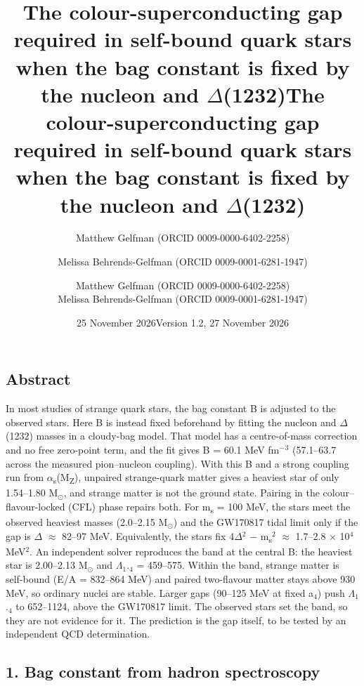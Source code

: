 \documentclass[
  11pt,
]{article}
\title{The colour-superconducting gap required in self-bound quark stars
when the bag constant is fixed by the nucleon and \ensuremath{\Delta}(1232)}
\author{Matthew Gelfman (ORCID 0009-0000-6402-2258) \and Melissa
Behrends-Gelfman (ORCID 0009-0001-6281-1947)}
\date{25 November 2026}
\title{The colour-superconducting gap required in self-bound quark stars when
the bag constant is fixed by the nucleon and \ensuremath{\Delta}(1232)}
\author{Matthew Gelfman (ORCID 0009-0000-6402-2258) \\ Melissa Behrends-Gelfman (ORCID 0009-0001-6281-1947)}
\date{Version 1.2, 27 November 2026}
\begin{document}
\maketitle
\hypertarget{abstract}{%
\subsection{Abstract}\label{abstract}}

In most studies of strange quark stars, the bag constant B is adjusted to the observed stars. Here B is instead fixed beforehand by fitting the nucleon and \ensuremath{\Delta}(1232) masses in a cloudy-bag model. That model has a centre-of-mass correction and no free zero-point term, and the fit gives B = 60.1 MeV fm\ensuremath{^{-}}\ensuremath{^{3}} (57.1--63.7 across the measured pion--nucleon coupling). With this B and a strong coupling run from \ensuremath{\alpha}\textsubscript{s}(M\textsubscript{Z}), unpaired strange-quark matter gives a heaviest star of only 1.54--1.80 M\ensuremath{_{\odot}}, and strange matter is not the ground state. Pairing in the colour--flavour-locked (CFL) phase repairs both. For m\textsubscript{s} = 100 MeV, the stars meet the observed heaviest masses (2.0--2.15 M\ensuremath{_{\odot}}) and the GW170817 tidal limit only if the gap is \ensuremath{\Delta} \ensuremath{\approx} 82--97 MeV. Equivalently, the stars fix 4\ensuremath{\Delta}\ensuremath{^{2}} \ensuremath{-} m\textsubscript{s}\ensuremath{^{2}} \ensuremath{\approx} 1.7--2.8 \ensuremath{\times} 10\ensuremath{^{4}} MeV\ensuremath{^{2}}. An independent solver reproduces the band at the central B: the heaviest star is 2.00--2.13 M\ensuremath{_{\odot}} and \ensuremath{\Lambda}\ensuremath{_{1}}.\ensuremath{_{4}} = 459--575. Within the band, strange matter is self-bound (E/A = 832--864 MeV) and paired two-flavour matter stays above 930 MeV, so ordinary nuclei are stable. Larger gaps (90--125 MeV at fixed a\ensuremath{_{4}}) push \ensuremath{\Lambda}\ensuremath{_{1}}.\ensuremath{_{4}} to 652--1124, above the GW170817 limit. The observed stars set the band, so they are not evidence for it. The prediction is the gap itself, to be tested by an independent QCD determination.

\hypertarget{bag-constant-from-hadron-spectroscopy}{%
\subsection{1. Bag constant from hadron spectroscopy}\label{bag-constant-from-hadron-spectroscopy}}
\end{document}
